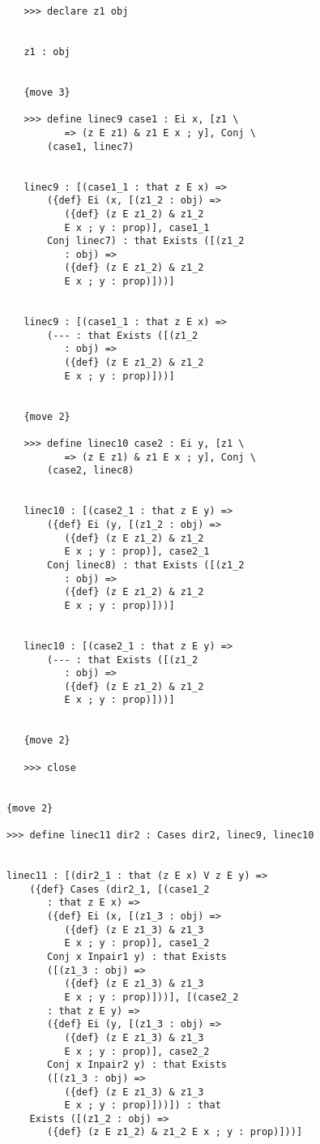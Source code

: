 \documentclass[12pt]{article}
\begin{document}
\begin{verbatim}
         >>> declare z1 obj


         z1 : obj


         {move 3}

         >>> define linec9 case1 : Ei x, [z1 \
                => (z E z1) & z1 E x ; y], Conj \
             (case1, linec7)


         linec9 : [(case1_1 : that z E x) => 
             ({def} Ei (x, [(z1_2 : obj) => 
                ({def} (z E z1_2) & z1_2 
                E x ; y : prop)], case1_1 
             Conj linec7) : that Exists ([(z1_2 
                : obj) => 
                ({def} (z E z1_2) & z1_2 
                E x ; y : prop)]))]


         linec9 : [(case1_1 : that z E x) => 
             (--- : that Exists ([(z1_2 
                : obj) => 
                ({def} (z E z1_2) & z1_2 
                E x ; y : prop)]))]


         {move 2}

         >>> define linec10 case2 : Ei y, [z1 \
                => (z E z1) & z1 E x ; y], Conj \
             (case2, linec8)


         linec10 : [(case2_1 : that z E y) => 
             ({def} Ei (y, [(z1_2 : obj) => 
                ({def} (z E z1_2) & z1_2 
                E x ; y : prop)], case2_1 
             Conj linec8) : that Exists ([(z1_2 
                : obj) => 
                ({def} (z E z1_2) & z1_2 
                E x ; y : prop)]))]


         linec10 : [(case2_1 : that z E y) => 
             (--- : that Exists ([(z1_2 
                : obj) => 
                ({def} (z E z1_2) & z1_2 
                E x ; y : prop)]))]


         {move 2}

         >>> close


      {move 2}

      >>> define linec11 dir2 : Cases dir2, linec9, linec10


      linec11 : [(dir2_1 : that (z E x) V z E y) => 
          ({def} Cases (dir2_1, [(case1_2 
             : that z E x) => 
             ({def} Ei (x, [(z1_3 : obj) => 
                ({def} (z E z1_3) & z1_3 
                E x ; y : prop)], case1_2 
             Conj x Inpair1 y) : that Exists 
             ([(z1_3 : obj) => 
                ({def} (z E z1_3) & z1_3 
                E x ; y : prop)]))], [(case2_2 
             : that z E y) => 
             ({def} Ei (y, [(z1_3 : obj) => 
                ({def} (z E z1_3) & z1_3 
                E x ; y : prop)], case2_2 
             Conj x Inpair2 y) : that Exists 
             ([(z1_3 : obj) => 
                ({def} (z E z1_3) & z1_3 
                E x ; y : prop)]))]) : that 
          Exists ([(z1_2 : obj) => 
             ({def} (z E z1_2) & z1_2 E x ; y : prop)]))]



\end{verbatim}
\end{document}

